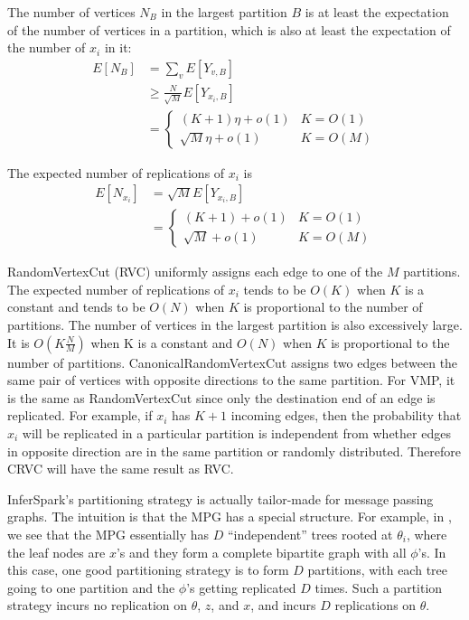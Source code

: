 The number of vertices $N_B$ in the largest partition $B$ is at least the expectation
of the number of vertices in a partition, which is also at least the
expectation of the number of $x_i$ in it:
\begin{align*}
	E[N_{B}] &= \sum_{v} E[Y_{v, B}] \\
		&\ge \frac{N}{\sqrt{M}} E[Y_{x_i, B}]	\\
		& = \left\{
				\begin{array}{ll}
					(K + 1)\eta	+ o(1) & K = O(1) \\
					\sqrt{M}\eta + o(1) & K = O(M)
				\end{array}
			\right.%
\end{align*}

The expected number of replications of $x_i$ is
\begin{align*}
	E[N_{x_i}] &= \sqrt{M}E[Y_{x_i, B}] \\
		&= \left\{
			\begin{array}{ll}
				(K + 1) + o(1) & K = O(1) \\
				\sqrt{M} + o(1) & K = O(M)
			\end{array}
		\right.%
\end{align*}


%
RandomVertexCut (RVC) uniformly assigns each edge to one of the $M$
partitions. The expected number of replications of $x_i$ tends to be $O(K)$
when $K$ is a constant and tends to be $O(N)$ when $K$ is proportional to the
number of partitions. The number of vertices in the largest partition is also
excessively large. It is $O(K\frac{N}{M})$ when K is a constant and $O(N)$
when $K$ is proportional to the number of partitions.  CanonicalRandomVertexCut
assigns two edges between the same pair of vertices with opposite directions
to the same partition. For VMP, it is the same as RandomVertexCut since only
the destination end of an edge is replicated. For example, if $x_i$ has $K +1$
incoming edges, then the probability that $x_i$ will be replicated in a
particular partition is independent from whether edges in opposite
direction are in the same partition or randomly distributed. Therefore
CRVC will have the same result as RVC.

InferSpark's partitioning strategy is actually tailor-made for message passing graphs.
The intuition is that the MPG has a special structure.
For example, in ,
we see that the MPG essentially has $D$ ``independent'' trees rooted at $\theta_i$,
where the leaf nodes  are $x$'s and they form a complete bipartite graph with all $\phi$'s.
In this case, one good partitioning strategy is to form $D$ partitions,
with each tree going to one partition and the $\phi$'s getting replicated $D$ times.
Such a partition strategy incurs no replication on $\theta$, $z$, and $x$,
and incurs $D$ replications on $\theta$.





